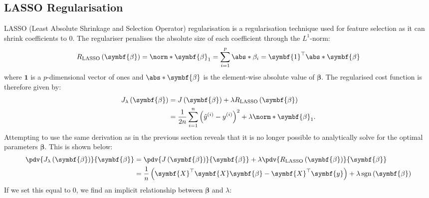 \documentclass{article}
\DeclareMathOperator{\sgn}{sgn}
\begin{document}
\subsection{LASSO Regularisation}
LASSO (Least Absolute Shrinkage and Selection Operator) regularisation
is a regularisation technique used for feature selection as it can
shrink coefficients to 0. The regulariser penalises the absolute size
of each coefficient through the \(L^1\)-norm:
\begin{equation*}
    R_{\mathrm{LASSO}}\left( \symbf{\beta} \right) = \norm*{\symbf{\beta}}_1 = \sum_{i = 1}^p \abs*{\beta_i} = \symbf{1}^\top \abs*{\symbf{\beta}}
\end{equation*}
where \(\symbf{1}\) is a \(p\)-dimensional vector of ones and
\(\abs*{\symbf{\beta}}\) is the element-wise absolute value of
\(\symbf{\beta}\). The regularised cost function is therefore given by:
\begin{align*}
    J_{\lambda}\left( \symbf{\beta} \right) & = J\left( \symbf{\beta} \right) + \lambda R_{\mathrm{LASSO}}\left( \symbf{\beta} \right)                                              \\
                                            & = \frac{1}{2n} \sum_{i = 1}^n {\left( \hat{y}^{\left( i \right)} - y^{\left( i \right)} \right)}^2 + \lambda \norm*{\symbf{\beta}}_1.
\end{align*}
Attempting to use the same derivation as in the previous section reveals
that it is no longer possible to analytically solve for the optimal
parameters \(\symbf{\beta}\). This is shown below:
\begin{align*}
    \pdv{J_{\lambda}\left( \symbf{\beta} \right)}{\symbf{\beta}} & = \pdv{J\left( \symbf{\beta} \right)}{\symbf{\beta}} + \lambda \pdv{R_{\mathrm{LASSO}}\left( \symbf{\beta} \right)}{\symbf{\beta}}          \\
                                                                 & = \frac{1}{n} \left( \symbf{X}^\top \symbf{X} \symbf{\beta} - \symbf{X}^\top \symbf{y} \right) + \lambda \sgn{\left( \symbf{\beta} \right)}
\end{align*}
If we set this equal to 0, we find an implicit relationship between
\(\symbf{\beta}\) and \(\lambda\):
\end{document}

